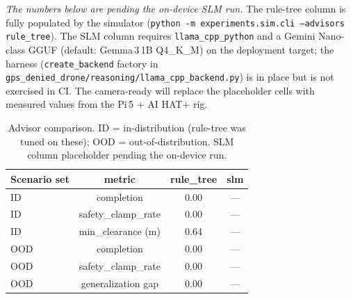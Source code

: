 \textit{The numbers below are pending the on-device SLM run.} The
rule-tree column is fully populated by the simulator
(\texttt{python -m experiments.sim.cli --advisors rule\_tree}).
The SLM column requires \texttt{llama\_cpp\_python} and a Gemini
Nano-class GGUF (default: Gemma\,3\,1B Q4\_K\_M) on the deployment
target; the harness (\texttt{create\_backend} factory in
\texttt{gps\_denied\_drone/reasoning/llama\_cpp\_backend.py}) is in
place but is not exercised in CI. The camera-ready will replace
the placeholder cells with measured values from the Pi\,5 + AI
HAT+ rig.

\begin{table}[t]
\caption{Advisor comparison.
ID = in-distribution (rule-tree was tuned on these);
OOD = out-of-distribution. SLM column placeholder pending the
on-device run.}
\label{tab:advisor}
\centering
\begin{tabular}{lccc}
\hline
Scenario set & metric & rule\_tree & slm \\
\hline
ID  & completion          & 0.00 & --- \\
ID  & safety\_clamp\_rate & 0.00 & --- \\
ID  & min\_clearance (m)  & 0.64 & --- \\
OOD & completion          & 0.00 & --- \\
OOD & safety\_clamp\_rate & 0.00 & --- \\
OOD & generalization gap  & 0.00 & --- \\
\hline
\end{tabular}
\end{table}
